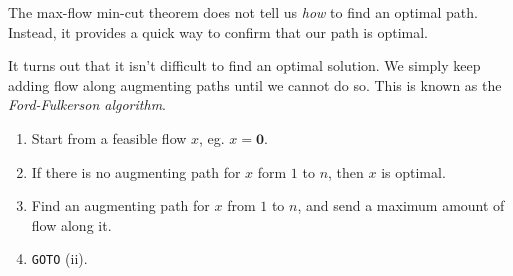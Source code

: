\documentclass[a4paper]{article}
\begin{document}
The max-flow min-cut theorem does not tell us \emph{how} to find an optimal path. Instead, it provides a quick way to confirm that our path is optimal.

It turns out that it isn't difficult to find an optimal solution. We simply keep adding flow along augmenting paths until we cannot do so. This is known as the \emph{Ford-Fulkerson algorithm}.

\begin{enumerate}
  \item Start from a feasible flow $x$, eg. $x = \mathbf{0}$.
  \item If there is no augmenting path for $x$ form $1$ to $n$, then $x$ is optimal.
  \item Find an augmenting path for $x$ from $1$ to $n$, and send a maximum amount of flow along it.
  \item \texttt{GOTO} (ii).
\end{enumerate}
\end{document}
